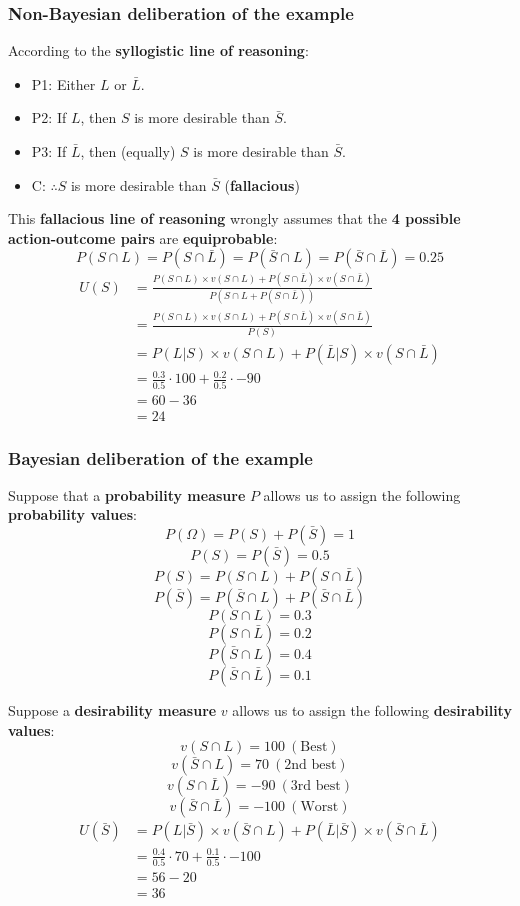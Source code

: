 \documentclass[11pt]{article}
\begin{document}
\subsubsection{Non-Bayesian deliberation of the example}
\label{sec:org3d10934}
According to the \textbf{syllogistic line of reasoning}:
\begin{itemize}
\item P1: Either \(L\) or \(\bar{L}\).
\item P2: If \(L\), then \(S\) is more desirable than \(\bar{S}\).
\item P3: If \(\bar{L}\), then (equally) \(S\) is more desirable than \(\bar{S}\).
\item C: \(\therefore S\) is more desirable than \(\bar{S}\) (\textbf{fallacious})
\end{itemize}

This \textbf{fallacious line of reasoning} wrongly assumes that the \textbf{4 possible action-outcome pairs} are \textbf{equiprobable}:
\[P(S \cap L) = P(S \cap \bar{L}) = P(\bar{S} \cap L) = P (\bar{S} \cap \bar{L}) = 0.25\]
\begin{align*}
U(S) &= \frac{P(S \cap L) \times v(S \cap L) + P(S \cap \bar{L}) \times v(S \cap \bar{L})}{P(S \cap L + P(S \cap \bar{L}))} \\
&= \frac{P(S \cap L) \times v(S \cap L) + P(S \cap \bar{L}) \times v(S \cap \bar{L})}{P(S)} \\
&= P(L | S) \times v (S \cap L) + P(\bar{L} | S) \times v(S \cap \bar{L}) \\
&= \frac{0.3}{0.5} \cdot 100 + \frac{0.2}{0.5} \cdot -90 \\
&= 60 - 36 \\
&= 24
\end{align*}

 \newpage
\subsubsection{Bayesian deliberation of the example}
\label{sec:orgd1204a2}
Suppose that a \textbf{probability measure} \(P\) allows us to assign the following \textbf{probability values}:
\[P(\Omega) = P(S) + P(\bar{S}) = 1\]
\[P(S) = P(\bar{S}) = 0.5\]
\[P(S) = P(S \cap L) + P(S \cap \bar{L})\]
\[P(\bar{S}) = P(\bar{S} \cap L) + P(\bar{S} \cap \bar{L})\]
\[P(S \cap L) = 0.3\]
\[P(S \cap \bar{L}) = 0.2\]
\[P(\bar{S} \cap L) = 0.4\]
\[P(\bar{S} \cap \bar{L}) = 0.1\]

Suppose a \textbf{desirability measure} \(v\) allows us to assign the following \textbf{desirability values}:
\[v(S \cap L) = 100 \ (\text{Best})\]
\[v(\bar{S} \cap L) = 70 \ (\text{2nd best})\]
\[v(S \cap \bar{L}) = -90 \ (\text{3rd best})\]
\[v(\bar{S} \cap \bar{L}) = -100 \ (\text{Worst})\]
\begin{align*}
U(\bar{S}) &= P(L | \bar{S}) \times v(\bar{S} \cap L) + P (\bar{L} | \bar{S}) \times v(\bar{S} \cap \bar{L}) \\
&= \frac{0.4}{0.5} \cdot 70 + \frac{0.1}{0.5} \cdot -100 \\
&= 56 - 20 \\
&= 36
\end{align*}
\end{document}
